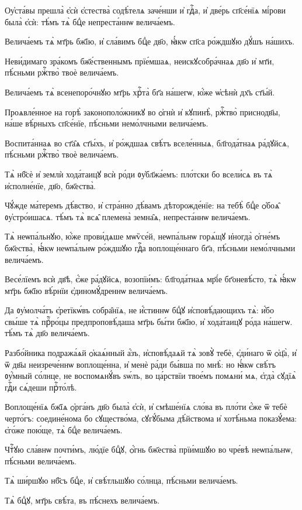 \hKv Оу҆ста́вы прешла̀ є҆сѝ є҆стества̀ содѣ́телѧ заче́нши и҆  гдⷭ҇а, и҆ две́рь сп҃се́нїѧ мі́рови была̀ є҆сѝ: тѣ́мъ тѧ̀  бцⷣе непреста́ннѡ велича́емъ. 

\hKv Велича́емъ тѧ̀ мт҃рь бж҃їю, и҆ сла́вимъ бцⷣе дв҃о, ꙗ҆́кѡ  сп҃са ро́ждшꙋю дꙋ́шъ на́шихъ.  

\hKv Неви́димаго зра́комъ бж҃е́ственнымъ прїе́мшаѧ,  неискꙋсобра́чнаѧ дв҃о и҆ мт҃и, пѣ́сньми ржⷭ҇тво̀ твоѐ  велича́емъ. 

\hKv Велича́емъ тѧ̀ всенепоро́чнꙋю мт҃рь хрⷭ҇та̀ бг҃а на́шегѡ,  ю҆́же ѡ҆сѣнѝ дх҃ъ ст҃ы́й. 

\hKv Проѧвле́нное на горѣ̀ законополо́жникꙋ во ѻ҆гнѝ и҆  кꙋпинѣ̀, ржⷭ҇тво̀ приснодв҃ы, на́ше вѣ́рныхъ сп҃се́нїе,  пѣ́сньми немо́лчными велича́емъ. 

\hKv Воспита́ннаѧ во ст҃а̑ѧ ст҃ы́хъ, и҆ ро́ждшаѧ свѣ́тъ  вселе́нныѧ, бл҃года́тнаѧ ра́дꙋйсѧ, пѣ́сньми ржⷭ҇тво̀ твоѐ  велича́емъ. 

\hKv Тѧ̀ нб҃сѐ и҆ землѝ хода́таицꙋ всѝ ро́ди ᲂу҆бл҃жа́емъ:  пло́тски бо всели́сѧ въ тѧ̀ и҆сполне́нїе, дв҃о, бж҃ества̀. 
%

\hKv Чꙋ́жде ма́теремъ  дѣ́вство, и҆ стра́нно дѣ́вамъ дѣторожде́нїе: на тебѣ̀  бцⷣе ѻ҆боѧ̑ ᲂу҆стро́ишасѧ. тѣ́мъ тѧ̀ всѧ̑ племена̀  земна̑ѧ, непреста́ннѡ велича́емъ.  

\hKv Тѧ̀ неѡпа́льнꙋю, ю҆́же прови́дѧше мѡѷсе́й, неѡпа́льнѡ  горѧ́щꙋ и҆ногда̀ ѻ҆гне́мъ бж҃ества̀, ꙗ҆́кѡ неѡпа́льнѡ  ро́ждшꙋю гдⷭ҇а воплоще́ннаго бг҃а, пѣ́сньми немо́лчными  велича́емъ. 

\hKv Весе́лїемъ всѝ дв҃ѣ, є҆́же ра́дꙋйсѧ, возопїи́мъ:  бл҃года́тнаѧ мр҃і́е бг҃оневѣ́сто, тѧ̀ ꙗ҆́кѡ мт҃рь бж҃їю  вѣ́рнїи є҆диномꙋ́дреннѡ велича́емъ. 

\hKv Да ᲂу҆молча́тъ є҆ретїкѡ́въ собра̑нїѧ, не и҆́стиннѡ бцⷣꙋ  и҆сповѣ́дающихъ тѧ̀: и҆́бо свы́ше тѧ̀ прⷪ҇ро́цы  предпроповѣ́даша мт҃рь бы́ти бж҃їю, и҆ хода́таицꙋ ро́да  на́шегѡ. тѣ́мъ тѧ̀ дв҃о велича́емъ. 

\hKv Разбо́йника подража́ѧй ѻ҆каѧ́нный а҆́зъ, и҆сповѣ́даѧй тѧ̀  зовꙋ̀ тебѐ, є҆ди́наго ѿ ѻ҆ц҃а̀, и҆ ѿ дв҃ы  неизрече́ннѡ воплоще́нна, и҆ менѐ ра́ди бы́вша по мнѣ̀: но  ꙗ҆́кѡ свѣ́тъ ᲂу҆́мный со́лнце, не воспомѧнꙋ́въ ѕѡ́лъ, во  ца́рствїи твое́мъ помѧни́ мѧ, є҆гда̀ сꙋдїѧ̀ гдⷭ҇и сѧ́деши  прⷭ҇то́лѣ.  

\hKv Воплоще́нїѧ бж҃їѧ ѻ҆рга́нъ дв҃о была̀ є҆сѝ, и҆ смѣше́нїѧ  сло́ва въ пло́ти є҆́же ѿ тебѐ черто́гъ: соедине́нома бо  сꙋщество́ма, сꙋгꙋ́быма дѣ́йствома и҆ хотѣ́ньма показꙋ́ема:  є҆го́же пою́ще, тѧ̀ бцⷣе велича́емъ. 

\hKv Чтⷭ҇ꙋю сла́внѡ почти́мъ, лю́дїе бцⷣꙋ, ѻ҆́гнь бж҃ества̀  прїи́мшꙋю во чре́вѣ неѡпа́льнѡ, пѣ́сньми велича́емъ. 

\hKv Тѧ̀ ши́ршꙋю нб҃съ бцⷣе, и҆ свѣ́тльшꙋю со́лнца, пѣ́сньми  велича́емъ. 

\hKv Тѧ̀ бцⷣꙋ, мт҃рь свѣ́та, въ пѣ́снехъ велича́емъ.  

\vskip2cm
